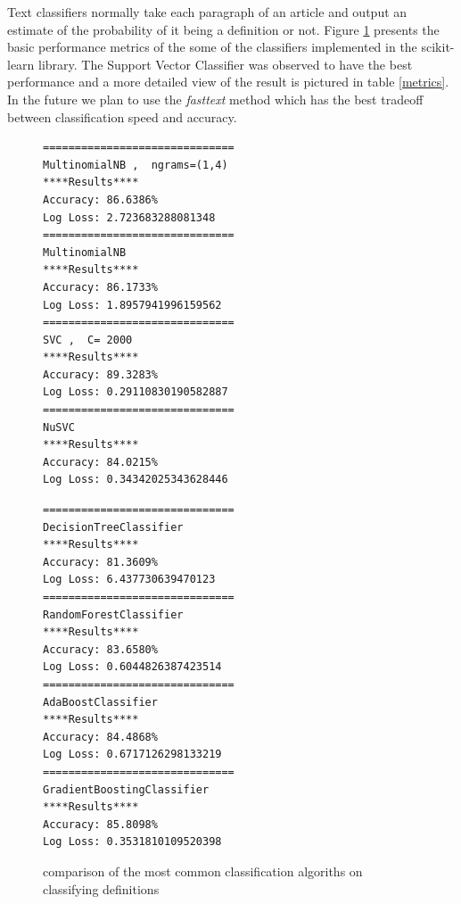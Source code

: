 \documentclass[a4paper]{easychair}
\begin{document}
 Text classifiers normally take each paragraph of an article and output an estimate of the probability of it being a definition or not.  Figure \ref{showdown} presents the basic performance metrics of the some of the classifiers implemented in the scikit-learn library. The Support Vector Classifier was observed to have the best performance and a more detailed view of the result is pictured in table \ref{metrics}. In the future we plan  to use the \textit{fasttext} method \cite{bagof} which has the best tradeoff between classification speed and accuracy.  

\begin{figure}
    \centering
    \begin{minipage}{0.45\textwidth}
        \centering
        {\small \begin{verbatim}
==============================
MultinomialNB ,  ngrams=(1,4)
****Results****
Accuracy: 86.6386%
Log Loss: 2.723683288081348
==============================
MultinomialNB
****Results****
Accuracy: 86.1733%
Log Loss: 1.8957941996159562
==============================
SVC ,  C= 2000
****Results****
Accuracy: 89.3283%
Log Loss: 0.29110830190582887
==============================
NuSVC
****Results****
Accuracy: 84.0215%
Log Loss: 0.34342025343628446
        \end{verbatim}}

    \end{minipage}\hfill
    \begin{minipage}{0.45\textwidth}
        \centering
        {\small
        \begin{verbatim}
==============================
DecisionTreeClassifier
****Results****
Accuracy: 81.3609%
Log Loss: 6.437730639470123
==============================
RandomForestClassifier
****Results****
Accuracy: 83.6580%
Log Loss: 0.6044826387423514
==============================
AdaBoostClassifier
****Results****
Accuracy: 84.4868%
Log Loss: 0.6717126298133219
==============================
GradientBoostingClassifier
****Results****
Accuracy: 85.8098%
Log Loss: 0.3531810109520398
        \end{verbatim}}
    \end{minipage}
        \caption{\label{showdown}comparison of the most common classification algoriths on classifying definitions}
\end{figure}
\end{document}
